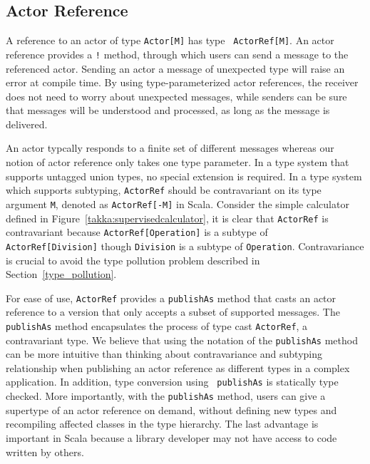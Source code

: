 \subsection{Actor Reference}
\label{actor_ref}
A reference to an actor of type {\tt Actor[M]} has type {\tt
ActorRef[M]}.  An actor reference provides a {\tt !} method, through which users
can send a message to the referenced actor.  Sending an actor a message of 
unexpected type will raise an error at compile time. By using 
type-parameterized actor references, the receiver does not need to worry about 
unexpected messages, while senders can be sure that messages will be understood 
and processed, as long as the message is delivered.

An actor typcally responds to a finite set of different messages 
whereas our notion of actor reference only takes one type parameter.  In a 
type system that supports untagged union types, no special extension is
required.  In a type system which supports subtyping, {\tt ActorRef} should
be contravariant on its type argument {\tt M}, denoted as {\tt ActorRef[-M]} in 
Scala. Consider the simple calculator defined in Figure~\ref{takka:supervisedcalculator}, it is clear that {\tt ActorRef} is 
contravariant because {\tt ActorRef[Operation]} is a subtype of {\tt 
ActorRef[Division]} though {\tt Division} is a subtype of {\tt Operation}. 
Contravariance is crucial to avoid the type pollution problem described in 
Section~\ref{type_pollution}.  

For ease of use, {\tt ActorRef} provides a {\tt publishAs} method that 
casts an actor reference to a version that only accepts a subset of supported 
messages.  The {\tt publishAs} method encapsulates the process of type cast 
{\tt ActorRef}, a contravariant type.  We believe that using the notation of the
{\tt publishAs} method can be more intuitive than thinking about contravariance 
and subtyping relationship when publishing an actor reference as different 
types in a complex application.  In addition, type conversion using {\tt 
publishAs} is statically type checked.  More importantly, with the 
{\tt publishAs} method, users can give a supertype of an actor reference on 
demand, without defining new types and recompiling affected classes in the type 
hierarchy.  The last advantage is important in Scala because a library 
developer may not have access to code written by others.


